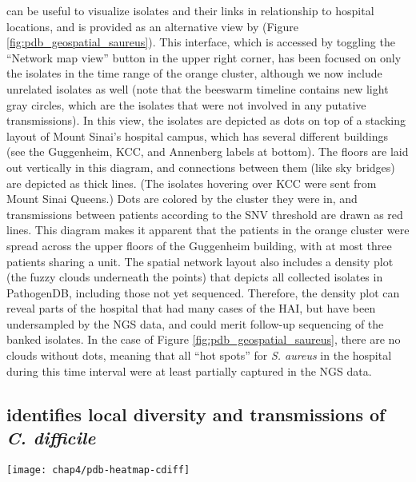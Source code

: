  can be useful to visualize isolates and their links in relationship to hospital locations, and is provided as an alternative view by \pathogendbviz{} (Figure \ref{fig:pdb_geospatial_saureus}). This interface, which is accessed by toggling the ``Network map view'' button in the upper right corner, has been focused on only the isolates in the time range of the orange cluster, although we now include unrelated isolates as well (note that the beeswarm timeline contains new light gray circles, which are the isolates that were not involved in any putative transmissions). In this view, the isolates are depicted as dots on top of a stacking layout of Mount Sinai's hospital campus, which has several different buildings (see the Guggenheim, KCC, and Annenberg labels at bottom). The floors are laid out vertically in this diagram, and connections between them (like sky bridges) are depicted as thick lines. (The isolates hovering over KCC were sent from Mount Sinai Queens.) Dots are colored by the cluster they were in, and transmissions between patients according to the SNV threshold are drawn as red lines. This diagram makes it apparent that the patients in the orange cluster were spread across the upper floors of the Guggenheim building, with at most three patients sharing a unit. The spatial network layout also includes a density plot (the fuzzy clouds underneath the points) that depicts all collected isolates in PathogenDB, including those not yet sequenced. Therefore, the density plot can reveal parts of the hospital that had many cases of the HAI, but have been undersampled by the NGS data, and could merit follow-up sequencing of the banked isolates. In the case of Figure \ref{fig:pdb_geospatial_saureus}, there are no clouds without dots, meaning that all ``hot spots'' for \emph{S. aureus} in the hospital during this time interval were at least partially captured in the NGS data.

\subsection{\pathogendbviz{} identifies local diversity and transmissions of \emph{C. difficile}}

\begin{sidewaysfigure}[hp]
  \sidewaysvspace
  \centering
  \texttt{[image: chap4/pdb-heatmap-cdiff]}               
\end{sidewaysfigure}


